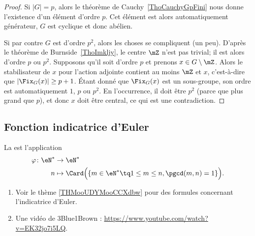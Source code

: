 \begin{proof}
	Si \( | G |=p\), alors le théorème de Cauchy~\ref{ThoCauchyGpFini} nous donne l'existence d'un élément d'ordre \( p\). Cet élément est alors automatiquement générateur, \( G\) est cyclique et donc abélien.

	Si par contre \( G\) est d'ordre \( p^2\), alors les choses se compliquent (un peu). D'après le théorème de Burnside~\ref{ThoImkljy}, le centre \( \mZ\) n'est pas trivial; il est alors d'ordre \( p\) ou \( p^2\). Supposons qu'il soit d'ordre \( p\) et prenons \( x\in G\setminus\mZ\). Alors le stabilisateur de \( x\) pour l'action adjointe contient au moins \( \mZ\) et \( x\), c'est-à-dire que \( |\Fix_G(x)|\geq p+1\). Étant donné que \( \Fix_G(x)\) est un sous-groupe, son ordre est automatiquement \( 1\), \( p\) ou \( p^2\). En l'occurrence, il doit être \( p^2\) (parce que plus grand que \( p\)), et donc \( x\) doit être central, ce qui est une contradiction.
\end{proof}



\subsection{Fonction indicatrice d'Euler}

\begin{definition}		\label{DEFooZRYMooZCozga}
	La  est l'application
	\begin{equation}
		\begin{aligned}
			\varphi\colon \eN^* & \to \eN^*                                                                    \\
			n                   & \mapsto \Card\Big(   \{ m\in \eN^*\tq 1\leq m\leq n, \pgcd(m,n)=1 \}  \Big).
		\end{aligned}
	\end{equation}
\end{definition}

\begin{normaltext}
	\begin{enumerate}
		\item
		      Voir le thème \ref{THMooUDYMooCCXdbw} pour des formules concernant l'indicatrice d'Euler.
		\item

		      Une vidéo de 3Blue1Brown : \url{https://www.youtube.com/watch?v=EK32jo7i5LQ}.
	\end{enumerate}
\end{normaltext}

